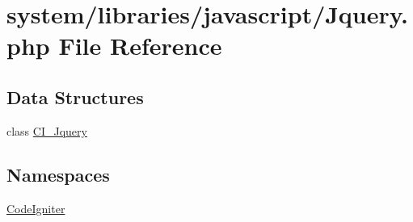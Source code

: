 \hypertarget{_jquery_8php}{\section{system/libraries/javascript/\-Jquery.php File Reference}
\label{_jquery_8php}
}
\subsection*{Data Structures}
\begin{DoxyCompactItemize}
\item 
class \hyperlink{class_c_i___jquery}{C\-I\-\_\-\-Jquery}
\end{DoxyCompactItemize}
\subsection*{Namespaces}
\begin{DoxyCompactItemize}
\item 
\hyperlink{namespace_code_igniter}{Code\-Igniter}
\end{DoxyCompactItemize}
